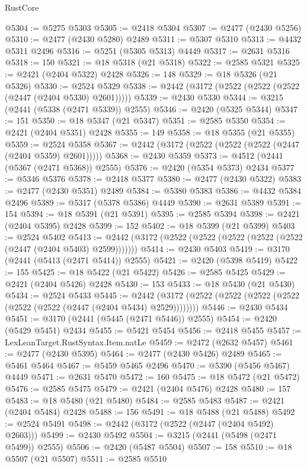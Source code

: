 \begin{lexlean}{RustCore}
\begin{coremodule}
@5304 := @5275 @5303
@5305 := @2418 @5304
@5307 := @2477 (@2430 @5256)
@5310 := @2477 (@2430 @5280) @2489
@5311 := @5307 @5310
@5313 := @4432 @5311 @2496
@5316 := @5251 (@5305 @5313) @4449
@5317 := @2631 @5316
@5318 := 150
@5321 := @18 @5318 (@21 @5318)
@5322 := @2585 @5321
@5325 := @2421 (@2404 @5322) @2428
@5326 := 148
@5329 := @18 @5326 (@21 @5326)
@5330 := @2524 @5329
@5338 := @2442 (@3172 (@2522 (@2522 (@2522 (@2447 (@2404 @5330) @2601)))))
@5339 := @2430 @5330
@5344 := @3215 (@2441 (@5338 (@2471 @5339)) @2555)
@5346 := @2420 (@5325 @5344)
@5347 := 151
@5350 := @18 @5347 (@21 @5347)
@5351 := @2585 @5350
@5354 := @2421 (@2404 @5351) @2428
@5355 := 149
@5358 := @18 @5355 (@21 @5355)
@5359 := @2524 @5358
@5367 := @2442 (@3172 (@2522 (@2522 (@2522 (@2447 (@2404 @5359) @2601)))))
@5368 := @2430 @5359
@5373 := @4512 (@2441 (@5367 (@2471 @5368)) @2555)
@5376 := @2420 (@5354 @5373) @2434
@5377 := @5346 @5376
@5378 := @2418 @5377
@5380 := @2477 (@2430 @5322)
@5383 := @2477 (@2430 @5351) @2489
@5384 := @5380 @5383
@5386 := @4432 @5384 @2496
@5389 := @5317 (@5378 @5386) @4449
@5390 := @2631 @5389
@5391 := 154
@5394 := @18 @5391 (@21 @5391)
@5395 := @2585 @5394
@5398 := @2421 (@2404 @5395) @2428
@5399 := 152
@5402 := @18 @5399 (@21 @5399)
@5403 := @2524 @5402
@5413 := @2442 (@3172 (@2522 (@2522 (@2522 (@2522 (@2522 (@2447 (@2404 @5403) @2599)))))))
@5414 := @2430 @5403
@5419 := @3170 (@2441 (@5413 (@2471 @5414)) @2555)
@5421 := @2420 (@5398 @5419)
@5422 := 155
@5425 := @18 @5422 (@21 @5422)
@5426 := @2585 @5425
@5429 := @2421 (@2404 @5426) @2428
@5430 := 153
@5433 := @18 @5430 (@21 @5430)
@5434 := @2524 @5433
@5445 := @2442 (@3172 (@2522 (@2522 (@2522 (@2522 (@2522 (@2522 (@2447 (@2404 @5434) @2529))))))))
@5446 := @2430 @5434
@5451 := @3170 (@2441 (@5445 (@2471 @5446)) @2555)
@5454 := @2420 (@5429 @5451) @2434
@5455 := @5421 @5454
@5456 := @2418 @5455
@5457 := LexLeanTarget.RustSyntax.Item.natLe
@5459 := @2472 (@2632 @5457)
@5461 := @2477 (@2430 @5395)
@5464 := @2477 (@2430 @5426) @2489
@5465 := @5461 @5464
@5467 := @5459 @5465 @2496
@5470 := @5390 (@5456 @5467) @4449
@5471 := @2631 @5470
@5472 := 160
@5475 := @18 @5472 (@21 @5472)
@5476 := @2585 @5475
@5479 := @2421 (@2404 @5476) @2428
@5480 := 157
@5483 := @18 @5480 (@21 @5480)
@5484 := @2585 @5483
@5487 := @2421 (@2404 @5484) @2428
@5488 := 156
@5491 := @18 @5488 (@21 @5488)
@5492 := @2524 @5491
@5498 := @2442 (@3172 (@2522 (@2447 (@2404 @5492) @2603)))
@5499 := @2430 @5492
@5504 := @3215 (@2441 (@5498 (@2471 @5499)) @2555)
@5506 := @2420 (@5487 @5504)
@5507 := 158
@5510 := @18 @5507 (@21 @5507)
@5511 := @2585 @5510

\end{coremodule}
\end{lexlean}
